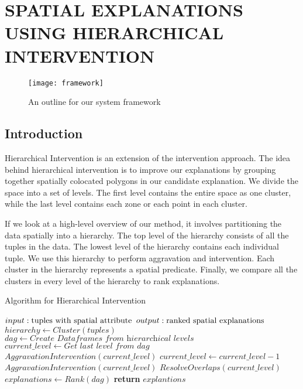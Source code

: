 \chapter{SPATIAL EXPLANATIONS USING HIERARCHICAL INTERVENTION}
\label{chp:proposed}
\label{sec:hei_intervention}

\begin{figure}[h]
\texttt{[image: framework]}
\caption{An outline for our system framework}
\label{fig:framework}
\end{figure}

\section{Introduction}
Hierarchical Intervention is an extension of the intervention approach. The idea behind hierarchical intervention is to improve our explanations by grouping together spatially colocated polygons in our candidate explanation. We divide the space into a set of levels. The first level contains the entire space as one cluster, while the last level contains each zone or each point in each cluster.

If we look at a high-level overview of our method, it involves partitioning the data spatially into a hierarchy. The top level of the hierarchy consists of all the tuples in the data. The lowest level of the hierarchy contains each individual tuple. We use this hierarchy to perform aggravation and intervention. Each cluster in the hierarchy represents a spatial predicate. Finally, we compare all the clusters in every level of the hierarchy to rank explanations.


\begin{algorithm}
\caption{Algorithm for Hierarchical Intervention}\label{alg:hieint}
\begin{algorithmic}[1]
	\State $input: \textnormal{tuples with spatial attribute}$
    \State $output: \textnormal{ranked spatial explanations}$
    \State $hierarchy \gets Cluster(tuples)$
    \State $dag \gets \textit{Create Dataframes from hierarchical levels}$
    \State $current\_level \gets \textit{Get last level from }dag$
    \State $AggravationIntervention(current\_level)$
    \State $current\_level \gets current\_level - 1$
    	\State $AggravationIntervention(current\_level)$
        \State $ResolveOverlaps(current\_level)$
    \EndWhile
    \State $explanations \gets Rank(dag)$
    \State \textbf{return} $explantions$
\EndProcedure
\end{algorithmic}
\end{algorithm}


